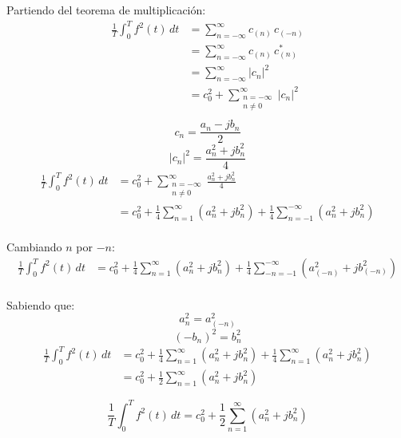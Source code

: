 Partiendo del teorema de multiplicación:
\begin{equation*}
\begin{split}
    \frac{1}{T}\int_0^T f^2(t)\,dt
        &=\sum_{n={-\infty}}^\infty c_{(n)}\,c_{(-n)}\\
        &=\sum_{n={-\infty}}^\infty c_{(n)}\,c_{(n)}^*\\
        &=\sum_{n={-\infty}}^\infty {|c_n|}^2\\
        &=c_0^2+\sum_{\substack{n=-\infty\\n\neq0}}^\infty {|c_n|}^2\\
\end{split}
\end{equation*}
\begin{equation*}
    c_n=\frac{a_n-jb_n}{2}
\end{equation*}
\begin{equation*}
    {|c_n|}^2=\frac{a_n^2+jb_n^2}{4}
\end{equation*}
\begin{equation*}
\begin{split}
    \frac{1}{T}\int_0^T f^2(t)\,dt
        &=c_0^2+\sum_{\substack{n=-\infty\\n\neq0}}^\infty
            \frac{a_n^2+jb_n^2}{4}\\
        &=c_0^2+\frac{1}{4}\sum_{n=1}^\infty(a_n^2+jb_n^2)
            +\frac{1}{4}\sum_{n=-1}^{-\infty}(a_n^2+jb_n^2)\\
\end{split}
\end{equation*}

Cambiando $n$ por $-n$:
\begin{equation*}
\begin{split}
    \frac{1}{T}\int_0^T f^2(t)\,dt
        &=c_0^2+\frac{1}{4}\sum_{n=1}^\infty(a_n^2+jb_n^2)
            +\frac{1}{4}\sum_{-n=-1}^{-\infty}(a_{(-n)}^2+jb_{(-n)}^2)\\
\end{split}
\end{equation*}

Sabiendo que:
\begin{equation*}
    a_n^2=a_{(-n)}^2
\end{equation*}
\begin{equation*}
    {(-b_n)}^2=b_n^2
\end{equation*}
\begin{equation*}
\begin{split}
    \frac{1}{T}\int_0^T f^2(t)\,dt
        &=c_0^2+\frac{1}{4}\sum_{n=1}^\infty(a_n^2+jb_n^2)
            +\frac{1}{4}\sum_{n=1}^\infty(a_n^2+jb_n^2)\\
        &=c_0^2+\frac{1}{2}\sum_{n=1}^\infty(a_n^2+jb_n^2)
\end{split}
\end{equation*}

\begin{equation}
    \frac{1}{T}\int_0^T f^2(t)\,dt
        =c_0^2+\frac{1}{2}\sum_{n=1}^\infty(a_n^2+jb_n^2)
\end{equation}

